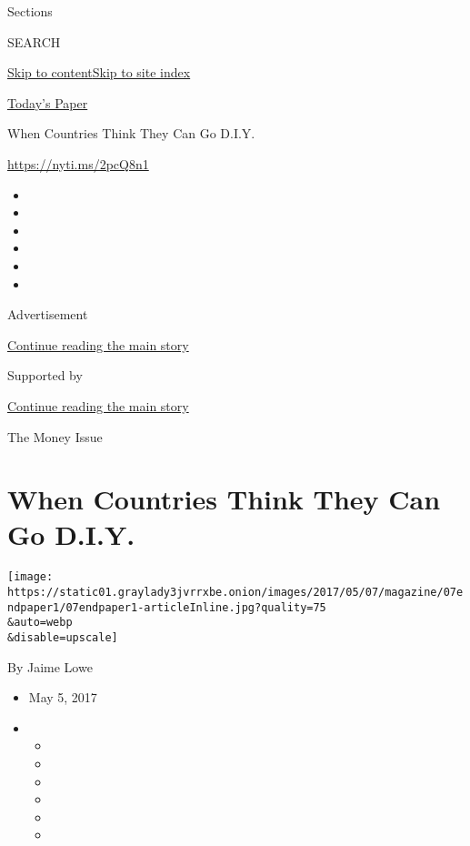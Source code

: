 Sections

SEARCH

\protect\hyperlink{site-content}{Skip to
content}\protect\hyperlink{site-index}{Skip to site index}

\href{https://myaccount.nytimes3xbfgragh.onion/auth/login?response_type=cookie\&client_id=vi}{}

\href{https://www.nytimes3xbfgragh.onion/section/todayspaper}{Today's
Paper}

When Countries Think They Can Go D.I.Y.

\url{https://nyti.ms/2pcQ8n1}

\begin{itemize}
\item
\item
\item
\item
\item
\item
\end{itemize}

Advertisement

\protect\hyperlink{after-top}{Continue reading the main story}

Supported by

\protect\hyperlink{after-sponsor}{Continue reading the main story}

The Money Issue

\hypertarget{when-countries-think-they-can-go-diy}{%
\section{When Countries Think They Can Go
D.I.Y.}\label{when-countries-think-they-can-go-diy}}

\texttt{[image: https://static01.graylady3jvrrxbe.onion/images/2017/05/07/magazine/07endpaper1/07endpaper1-articleInline.jpg?quality=75\\\&auto=webp\\\&disable=upscale]}

By Jaime Lowe

\begin{itemize}
\item
  May 5, 2017
\item
  \begin{itemize}
  \item
  \item
  \item
  \item
  \item
  \item
  \end{itemize}
\end{itemize}

